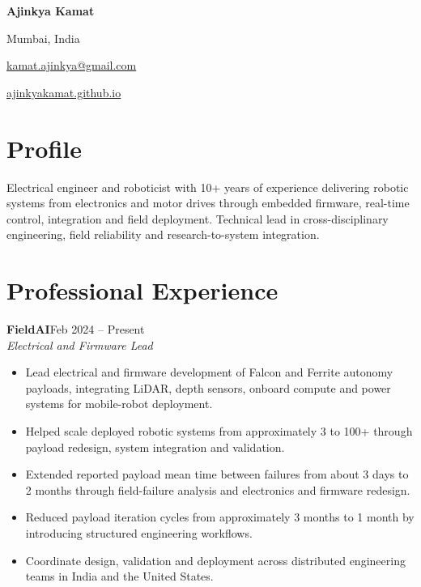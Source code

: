 \documentclass[11pt,a4paper]{article}
\newcommand{\role}[3]{%
  \Needspace{6\baselineskip}%
  \textbf{#1}\hfill #3\\
  \textit{#2}\par
}
\begin{document}
\noindent
\begin{minipage}[c]{0.52\textwidth}
  {\fontsize{24}{27}\selectfont\bfseries Ajinkya Kamat}\par

\end{minipage}%
\begin{minipage}[c]{0.48\textwidth}
  \raggedleft\small
  Mumbai, India\par
  \href{mailto:kamat.ajinkya@gmail.com}{kamat.ajinkya@gmail.com}\par
  \href{https://ajinkyakamat.github.io}{ajinkyakamat.github.io}
\end{minipage}

\section*{Profile}
Electrical engineer and roboticist with 10+ years of experience delivering
robotic systems from electronics and motor drives through embedded firmware,
real-time control, integration and field deployment. Technical lead in
cross-disciplinary engineering, field reliability and research-to-system integration.

\section*{Professional Experience}

\role{FieldAI}{Electrical and Firmware Lead}{Feb 2024 -- Present}
\begin{itemize}
  \item Lead electrical and firmware development of Falcon and Ferrite
  autonomy payloads, integrating LiDAR, depth sensors, onboard compute
  and power systems for mobile-robot deployment.
  \item Helped scale deployed robotic systems from approximately 3 to
  100+ through payload redesign, system integration and validation.
  \item Extended reported payload mean time between failures from about
  3 days to 2 months through field-failure analysis and electronics
  and firmware redesign.
  \item Reduced payload iteration cycles from approximately 3 months to
  1 month by introducing structured engineering workflows.
  \item Coordinate design, validation and deployment across distributed
  engineering teams in India and the United States.
\end{itemize}
\end{document}
